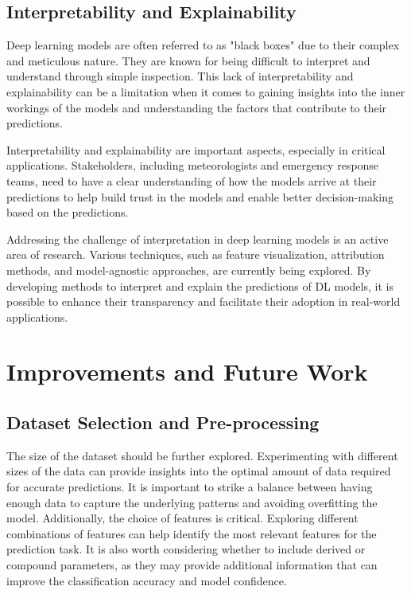 \subsection{Interpretability and Explainability}

Deep learning models are often referred to as "black boxes" due to their complex and meticulous nature. They are known for being difficult to interpret and understand through simple inspection. This lack of interpretability and explainability can be a limitation when it comes to gaining insights into the inner workings of the models and understanding the factors that contribute to their predictions.

Interpretability and explainability are important aspects, especially in critical applications. Stakeholders, including meteorologists and emergency response teams, need to have a clear understanding of how the models arrive at their predictions to help build trust in the models and enable better decision-making based on the predictions.

Addressing the challenge of interpretation in deep learning models is an active area of research. Various techniques, such as feature visualization, attribution methods, and model-agnostic approaches, are currently being explored. By developing methods to interpret and explain the predictions of DL models, it is possible to enhance their transparency and facilitate their adoption in real-world applications.

\section{Improvements and Future Work}

\subsection{Dataset Selection and Pre-processing}

The size of the dataset should be further explored. Experimenting with different sizes of the data can provide insights into the optimal amount of data required for accurate predictions. It is important to strike a balance between having enough data to capture the underlying patterns and avoiding overfitting the model. Additionally, the choice of features is critical. Exploring different combinations of features can help identify the most relevant features for the prediction task. It is also worth considering whether to include derived or compound parameters, as they may provide additional information that can improve the classification accuracy and model confidence.

